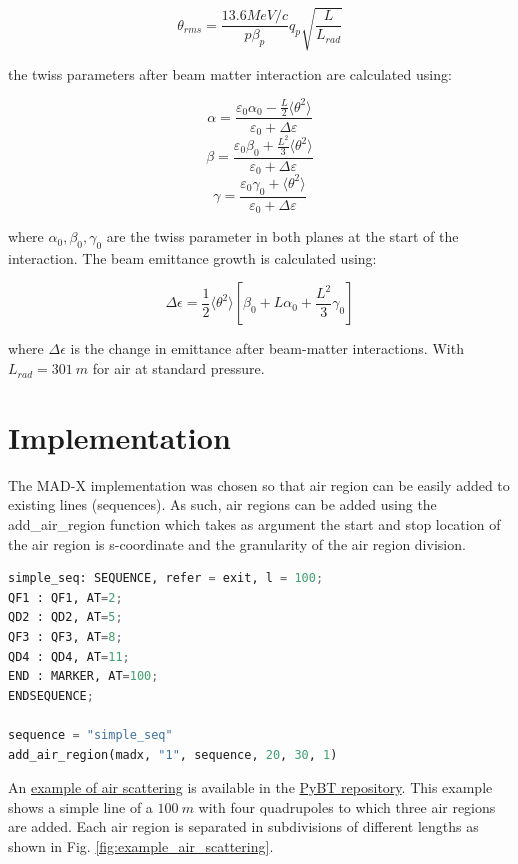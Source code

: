 \documentclass{cernatsnote}
\begin{document}
$$\theta_{rms} = \frac{13.6 MeV/c}{p\beta_{p}}q_{p} \sqrt{ \frac{L}{L_{rad}} }$$

the twiss parameters after beam matter interaction are calculated using:

$$\alpha = \frac{\varepsilon_0 \alpha_0 - \frac{L}{2}\langle\theta^2\rangle} {\varepsilon_0 + \Delta\varepsilon}$$
$$\beta = \frac{\varepsilon_0 \beta_0 + \frac{L^2}{3}\langle\theta^2\rangle}{\varepsilon_0 + \Delta\varepsilon}$$
$$\gamma = \frac{\varepsilon_0 \gamma_0 + \langle\theta^2\rangle}{\varepsilon_0 + \Delta\varepsilon}$$

where $\alpha_{0}, \beta_{0}, \gamma_{0}$ are the twiss parameter in both planes at the start of the interaction. The beam emittance growth is calculated using: 

$$\Delta\epsilon = \frac{1}{2} \langle \theta^2 \rangle \left[ \beta_0 + L\alpha_0 + \frac{L^2}{3} \gamma_0 \right]$$

where $\Delta\epsilon$ is the change in emittance after beam-matter interactions. With $L_{rad}=\SI{301}{m}$ for air at standard pressure.

\section{Implementation}

The MAD-X implementation was chosen so that air region can be easily added to existing lines (sequences). As such, air regions can be added using the add\_air\_region function which takes as argument the start and stop location of the air region is s-coordinate and the granularity of the air region division.
\\
\begin{lstlisting}[language=Python, caption=Python example]
simple_seq: SEQUENCE, refer = exit, l = 100;
QF1 : QF1, AT=2;
QD2 : QD2, AT=5;
QF3 : QF3, AT=8;
QD4 : QD4, AT=11;
END : MARKER, AT=100;
ENDSEQUENCE;

sequence = "simple_seq"
add_air_region(madx, "1", sequence, 20, 30, 1)
\end{lstlisting}

An \href{https://gitlab.cern.ch/abt-optics-and-code-repository/simulation-codes/pybt/-/blob/master/pybt/examples/example_air_scattering.ipynb?ref_type=heads}{example of air scattering} is available in the \href{https://gitlab.cern.ch/abt-optics-and-code-repository/simulation-codes/pybt/}{PyBT repository}. This example shows a simple line of a $\SI{100}{m}$ with four quadrupoles to which three air regions are added. Each air region is separated in subdivisions of different lengths as shown in Fig. \ref{fig:example_air_scattering}.
\end{document}
